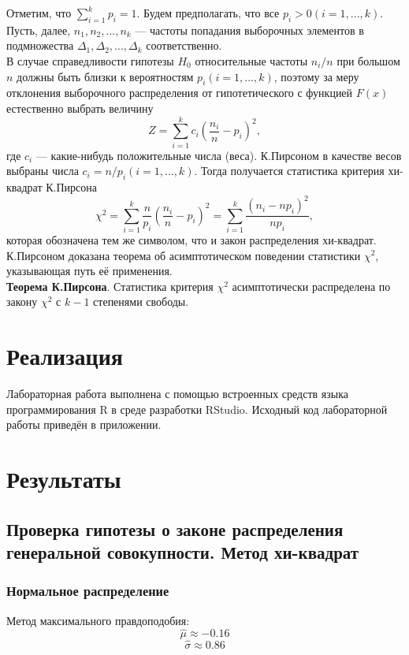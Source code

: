 Отметим, что $\sum_{i=1}^{k}p_i=1$. Будем предполагать, что все $p_i>0 (i=1, ... , k)$.\\

Пусть, далее, $n_1, n_2, ... , n_k$ — частоты попадания выборочных элементов в подмножества $\Delta_1, \Delta_2, ... , \Delta_k$ соответственно.\\

В случае справедливости гипотезы $H_0$ относительные частоты $n_i/n$ при большом $n$ должны быть близки к вероятностям $p_i (i=1, ... , k)$, поэтому за меру отклонения выборочного распределения от гипотетического с функцией $F(x)$ естественно выбрать величину
\begin{equation}
Z=\sum_{i=1}^{k}c_i(\frac{n_i}{n}-p_i)^2,
\end{equation}
где $c_i$ — какие-нибудь положительные числа (веса). К.Пирсоном в качестве весов выбраны числа $c_i=n/p_i (i=1, ... , k)$. Тогда получается статистика критерия хи-квадрат К.Пирсона
\begin{equation}
\chi^2=\sum_{i=1}^{k}\frac{n}{p_i}(\frac{n_i}{n}-p_i)^2=\sum_{i=1}^{k}\frac{(n_i-np_i)^2}{np_i},
\end{equation}
которая обозначена тем же символом, что и закон распределения хи-квадрат.\\

К.Пирсоном доказана теорема об асимптотическом поведении статистики $\chi^2$, указывающая путь её применения.\\

\textbf{Теорема К.Пирсона}. Статистика критерия $\chi^2$ асимптотически распределена по закону $\chi^2$ с $k-1$ степенями свободы.


\section{Реализация}
Лабораторная работа выполнена с помощью встроенных средств языка программирования R в среде разработки RStudio. Исходный код лабораторной работы приведён в приложении.


\section{Результаты}
\subsection{Проверка гипотезы о законе распределения генеральной совокупности. Метод хи-квадрат}
\subsubsection{Нормальное распределение}
Метод максимального правдоподобия:
\begin{equation}
\widehat{\mu}\approx-0.16
\end{equation}
\begin{equation}
\widehat{\sigma}\approx0.86
\end{equation}

